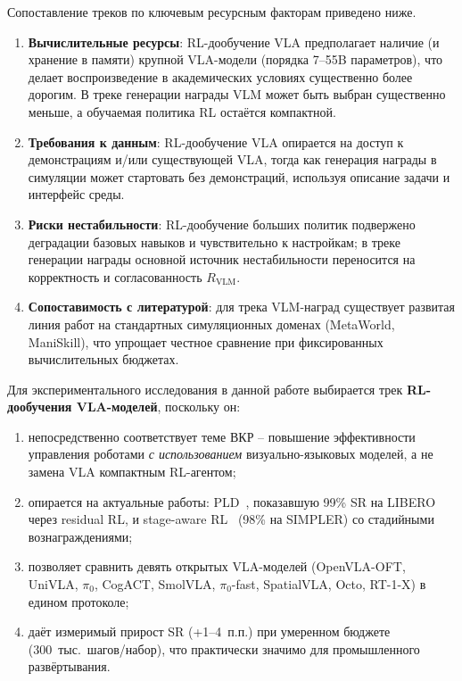     Сопоставление треков по ключевым ресурсным факторам приведено ниже.
    \begin{enumerate}
        \item \textbf{Вычислительные ресурсы}: RL-дообучение VLA предполагает наличие (и хранение в памяти) крупной VLA-модели (порядка 7--55B параметров), что делает воспроизведение в академических условиях существенно более дорогим. В треке генерации награды VLM может быть выбран существенно меньше, а обучаемая политика RL остаётся компактной.
        \item \textbf{Требования к данным}: RL-дообучение VLA опирается на доступ к демонстрациям и/или существующей VLA, тогда как генерация награды в симуляции может стартовать без демонстраций, используя описание задачи и интерфейс среды.
        \item \textbf{Риски нестабильности}: RL-дообучение больших политик подвержено деградации базовых навыков и чувствительно к настройкам; в треке генерации награды основной источник нестабильности переносится на корректность и согласованность $R_{\text{VLM}}$.
        \item \textbf{Сопоставимость с литературой}: для трека VLM-наград существует развитая линия работ на стандартных симуляционных доменах (MetaWorld, ManiSkill), что упрощает честное сравнение при фиксированных вычислительных бюджетах.
    \end{enumerate}

    Для экспериментального исследования в данной работе выбирается трек \textbf{RL-дообучения VLA-моделей}, поскольку он:

\begin{enumerate}
    \item непосредственно соответствует теме ВКР -- повышение эффективности управления роботами \textit{с использованием} визуально-языковых моделей, а не замена VLA компактным RL-агентом;
    \item опирается на актуальные работы: PLD~\cite{pld2026}, показавшую 99\% SR на LIBERO через residual RL, и stage-aware RL~\cite{starevla2025} (98\% на SIMPLER) со стадийными вознаграждениями;
    \item позволяет сравнить девять открытых VLA-моделей (OpenVLA-OFT, UniVLA, $\pi_0$, CogACT, SmolVLA, $\pi_0$-fast, SpatialVLA, Octo, RT-1-X) в едином протоколе;
    \item даёт измеримый прирост SR (+1--4~п.п.) при умеренном бюджете (300~тыс.\ шагов/набор), что практически значимо для промышленного развёртывания.
\end{enumerate}

